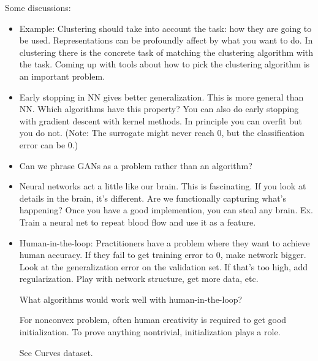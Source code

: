 Some discussions:
\begin{itemize}
\item
Example: Clustering should take into account the task: how they are going to be used. 
Representations can be profoundly affect by what you want to do.
In clustering there is the concrete task of matching the clustering algorithm with the task. Coming up with tools about how to pick the clustering algorithm is an important problem.

\item
Early stopping in NN gives better generalization. This is more general than NN. Which algorithms have this property? 
You can also do early stopping with gradient descent with kernel methods. In principle you can overfit but you do not.
(Note: The surrogate might never reach 0, but the classification error can be 0.)

\item
Can we phrase GANs as a problem rather than an algorithm?
\item
Neural networks act a little like our brain. This is fascinating. If you look at details in the brain, it's different. Are we functionally capturing what's happening?
Once you have a good implemention, you can steal any brain. Ex. Train a neural net to repeat blood flow and use it as a feature.
\item
Human-in-the-loop: Practitioners have a problem where they want to achieve human accuracy. If they fail to get training error to 0, make network bigger. Look at the generalization error on the validation set.
If that's too high, add regularization. Play with network structure, get more data, etc. 

What algorithms would work well with human-in-the-loop?

For nonconvex problem, often human creativity is required to get good initialization. To prove anything nontrivial, initialization plays a role.

See Curves dataset.
\end{itemize}

